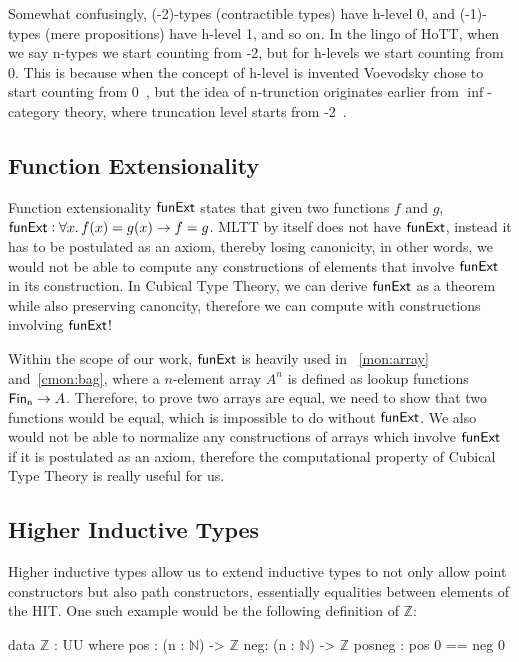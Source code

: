Somewhat confusingly, (-2)-types (contractible types) have h-level 0,
and (-1)-types (mere propositions) have h-level 1, and so on.
In the lingo of HoTT, when we say n-types we start counting from -2,
but for h-levels we start counting from 0. This is because when
the concept of h-level is invented Voevodsky chose to start counting
from 0~\cite{voevodsky_univalent_2010},
but the idea of n-trunction originates earlier from $\inf$-category theory,
where truncation level starts from -2~\cite{lurie_higher_2008}.

\subsection{Function Extensionality}
Function extensionality $\operatorname{\mathsf{funExt}}$ states that given two functions $f$ and $g$,
$\operatorname{\mathsf{funExt}}: \forall x.\,f(x) = g(x) \to f = g$. MLTT by itself does not have $\operatorname{\mathsf{funExt}}$,
instead it has to be postulated as an axiom, thereby losing canonicity, in other words,
we would not be able to compute any constructions of elements that involve $\operatorname{\mathsf{funExt}}$
in its construction. In Cubical Type Theory, we can derive $\operatorname{\mathsf{funExt}}$
as a theorem while also preserving canoncity, therefore we can compute with constructions
involving $\operatorname{\mathsf{funExt}}$!

Within the scope of our work, $\operatorname{\mathsf{funExt}}$ is heavily used in
~\cref{mon:array} and~\cref{cmon:bag}, where a $n$-element array $A^n$ is defined as lookup functions
$\Fin[n] \to A$. Therefore, to prove two arrays are equal, we need to show that two functions would be
equal, which is impossible to do without $\operatorname{\mathsf{funExt}}$. We also would not be able to normalize
any constructions of arrays which involve $\operatorname{\mathsf{funExt}}$ if it is postulated as an axiom, therefore
the computational property of Cubical Type Theory is really useful for us.

\subsection{Higher Inductive Types}\label{sec:HIT}
Higher inductive types
allow us to extend inductive types to not only allow point constructors
but also path constructors, essentially equalities between elements of the HIT. One such example
would be the following definition of $\mathbb{Z}$:

\vspace{-1em}
\begin{code}
data $\mathbb{Z}$ : UU where
    pos : (n : $\mathbb{N}$) -> $\mathbb{Z}$
    neg: (n : $\mathbb{N}$) -> $\mathbb{Z}$
    posneg : pos 0 == neg 0
\end{code}
\vspace{1em}

